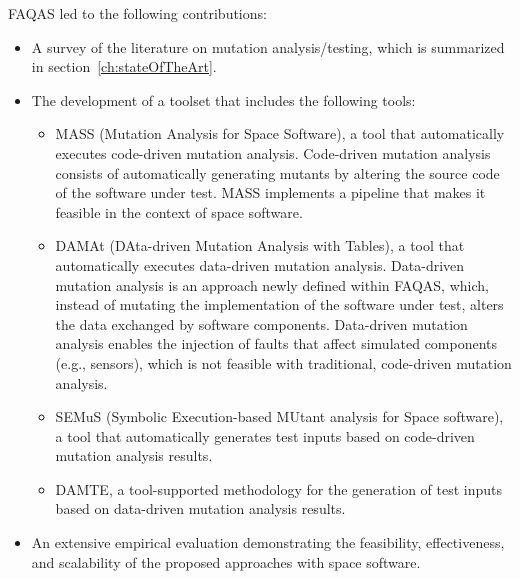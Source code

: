 FAQAS led to the following contributions:
\begin{itemize}
\item A survey of the literature on mutation analysis/testing, which is summarized in section~\ref{ch:stateOfTheArt}.
\item The development of a toolset that includes the following tools:
\begin{itemize}
\item MASS (Mutation Analysis for Space Software), a tool that automatically executes code-driven mutation analysis. Code-driven mutation analysis consists of automatically generating mutants by altering the source code of the software under test. MASS implements a pipeline that makes it feasible in the context of space software.
\item DAMAt (DAta-driven Mutation Analysis with Tables), a tool that automatically executes data-driven mutation analysis. Data-driven mutation analysis is an approach newly defined within FAQAS, which, instead of mutating the implementation of the software under test, alters the data exchanged by software components. Data-driven mutation analysis enables the injection of faults that affect simulated components (e.g., sensors), which is not feasible with traditional, code-driven mutation analysis.
\item SEMuS (Symbolic Execution-based MUtant analysis for Space software), a tool that automatically generates test inputs based on code-driven mutation analysis results. 
\item DAMTE, a tool-supported methodology for the generation of test inputs based on data-driven mutation analysis results.
\end{itemize}
\item An extensive empirical evaluation demonstrating the feasibility, effectiveness, and scalability of the proposed approaches with space software.
%

\end{itemize}
